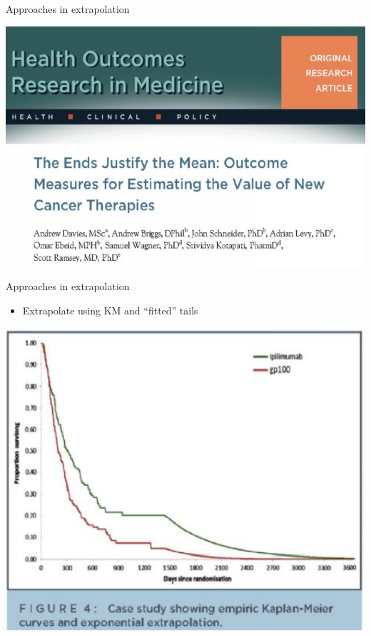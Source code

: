 \documentclass[
  ignorenonframetext,
]{beamer}
\providecommand{\tightlist}{%
  \setlength{\itemsep}{0pt}\setlength{\parskip}{0pt}}
\begin{document}
\begin{frame}{Approaches in extrapolation}
\protect\hypertarget{approaches-in-extrapolation-1}{}

\includegraphics[width=1\linewidth]{figures/endmeans}

\end{frame}

\begin{frame}{Approaches in extrapolation}
\protect\hypertarget{approaches-in-extrapolation-2}{}

\begin{itemize}
\tightlist
\item
  Extrapolate using KM and ``fitted'' tails
\end{itemize}

\includegraphics[width=1\linewidth]{figures/figure4means}

\end{frame}
\end{document}
